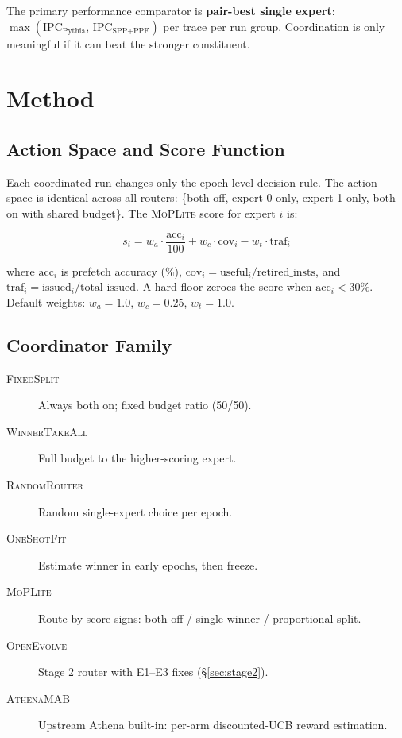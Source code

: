 \documentclass[10pt,twocolumn]{article}
\begin{document}
The primary performance comparator is \textbf{pair-best single expert}:
$\max(\text{IPC}_{\text{Pythia}},\, \text{IPC}_{\text{SPP+PPF}})$ per trace per run
group. Coordination is only meaningful if it can beat the stronger constituent.

\section{Method}
\label{sec:method}

\subsection{Action Space and Score Function}

Each coordinated run changes only the epoch-level decision rule. The action space
is identical across all routers: \{both off, expert 0 only, expert 1 only, both on
with shared budget\}. The \textsc{MoPLite} score for expert $i$ is:

\[
  s_i = w_a \cdot \frac{\text{acc}_i}{100}
       + w_c \cdot \text{cov}_i
       - w_t \cdot \text{traf}_i
\]

where $\text{acc}_i$ is prefetch accuracy (\%), $\text{cov}_i = \text{useful}_i /
\text{retired\_insts}$, and $\text{traf}_i = \text{issued}_i / \text{total\_issued}$.
A hard floor zeroes the score when $\text{acc}_i < 30\%$.
Default weights: $w_a = 1.0$, $w_c = 0.25$, $w_t = 1.0$.

\subsection{Coordinator Family}

\begin{description}
  \item[\textsc{FixedSplit}] Always both on; fixed budget ratio (50/50).
  \item[\textsc{WinnerTakeAll}] Full budget to the higher-scoring expert.
  \item[\textsc{RandomRouter}] Random single-expert choice per epoch.
  \item[\textsc{OneShotFit}] Estimate winner in early epochs, then freeze.
  \item[\textsc{MoPLite}] Route by score signs: both-off / single winner / proportional split.
  \item[\textsc{OpenEvolve}] Stage 2 router with E1--E3 fixes (§\ref{sec:stage2}).
  \item[\textsc{AthenaMAB}] Upstream Athena built-in: per-arm discounted-UCB reward estimation.
\end{description}
\end{document}
